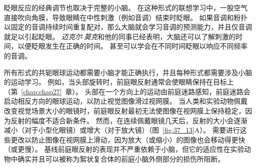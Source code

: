 眨眼反应的经典调节也取决于完整的小脑。
在这种形式的联想学习中，一股空气直接吹向角膜，导致眼睛在中性刺激（例如音调）结束时眨眼。
如果音调和粉扑以固定的音调持续时间重复配对，那么大脑就会学习音调的预测能力，并且仅音调就足以引起眨眼。
\textit{迈克尔$\cdot$莫克}和他的同事已经表明，大脑还可以了解刺激的时间，以便眨眼发生在正确的时间。
甚至可以学会在不同时间眨眼以响应不同频率的音调。


所有形式的共轭眼球运动都需要小脑才能正确执行，并且每种形式都需要涉及小脑的运动学习。
例如，当头部旋转时，前庭眼反射通常会使眼睛保持在目标上（第~\ref{chap:chap27}~章）。
头部在一个方向上的运动由前庭迷路感知，前庭迷路会启动相反方向的眼球运动，以防止视觉图像滑过视网膜。
当人类和实验动物佩戴改变视觉场景大小的眼镜时，前庭眼反射最初无法使图像在视网膜上保持稳定，因为反射的幅度不适合新条件。
然而，在连续佩戴眼镜几天后，反射的大小会逐渐减小（对于小型化眼镜）或增大（对于放大镜）（图~\ref{fig:37_13}A）。
需要进行这些更改以防止图像在视网膜上滑动，因为放大（或缩小）的图像也会移动得更快（或更慢）。
基线前庭眼反射的表现并不严重依赖于小脑，但它的适应性在实验动物中确实并且可以被称为絮状复合体的前庭小脑外侧部分的损伤所阻断。


